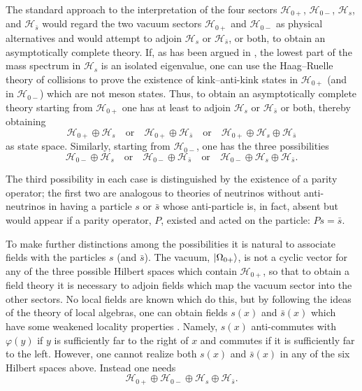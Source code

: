 The standard approach to the interpretation of the four sectors
$\mathcal H_{0+}$, $\mathcal H_{0-}$, $\mathcal H_s$, and $\mathcal H_{\bar s}$
would regard the two vacuum sectors $\mathcal H_{0+}$ and $\mathcal H_{0-}$ as
physical alternatives and would attempt to adjoin $\mathcal H_s$ or
$\mathcal H_{\bar s}$, or both, to obtain an asymptotically complete theory.
If, as has been argued in \cite{pct-app-87}, the lowest part of the mass spectrum in
$\mathcal H_s$ is an isolated eigenvalue, one can use the Haag--Ruelle theory
of collisions to prove the existence of kink--anti-kink states in
$\mathcal H_{0+}$ (and in $\mathcal H_{0-}$) which are not meson states.
Thus, to obtain an asymptotically complete theory starting from
$\mathcal H_{0+}$ one has at least to adjoin $\mathcal H_s$ or
$\mathcal H_{\bar s}$ or both, thereby obtaining
\begin{equation*}
  \mathcal H_{0+}\oplus\mathcal H_s
  \quad\text{or}\quad
  \mathcal H_{0+}\oplus\mathcal H_{\bar s}
  \quad\text{or}\quad
  \mathcal H_{0+}\oplus\mathcal H_s\oplus\mathcal H_{\bar s}
\end{equation*}
as state space.  Similarly, starting from $\mathcal H_{0-}$, one has the
three possibilities
\begin{equation*}
  \mathcal H_{0-}\oplus\mathcal H_s
  \quad\text{or}\quad
  \mathcal H_{0-}\oplus\mathcal H_{\bar s}
  \quad\text{or}\quad
  \mathcal H_{0-}\oplus\mathcal H_s\oplus\mathcal H_{\bar s}.
\end{equation*}

The third possibility in each case is distinguished by the existence of a
parity operator; the first two are analogous to theories of neutrinos
without anti-neutrinos in having a particle $s$ or $\bar s$ whose
anti-particle is, in fact, absent but would appear if a parity operator, $P$,
existed and acted on the particle: $Ps=\bar s$.

To make further distinctions among the possibilities it is natural to
associate fields with the particles $s$ (and $\bar s$).  The vacuum,
$\lvert \Omega_{0+}\rangle$, is not a cyclic vector for any of the three possible
Hilbert spaces which contain $\mathcal H_{0+}$, so that to obtain a field
theory it is necessary to adjoin fields which map the vacuum sector into the
other sectors.  No local fields are known which do this, but by following the
ideas of the theory of local algebras, one can obtain fields $s(x)$ and
$\bar s(x)$ which have some weakened locality properties \cite{pct-app-79}.  Namely,
$s(x)$ anti-commutes with $\varphi(y)$ if $y$ is sufficiently far to the
right of $x$ and commutes if it is sufficiently far to the left.  However,
one cannot realize both $s(x)$ and $\bar s(x)$ in any of the six Hilbert
spaces above.  Instead one needs
\begin{equation*}
  \mathcal H_{0+}\oplus\mathcal H_{0-}\oplus\mathcal H_s\oplus\mathcal H_{\bar s}.
\end{equation*}

